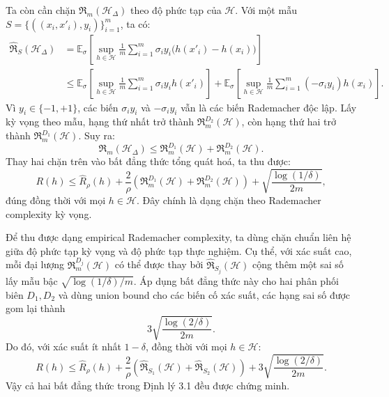 Ta còn cần chặn \(\mathfrak{R}_m(\mathcal{H}_{\Delta})\) theo độ phức tạp của \(\mathcal{H}\). Với một mẫu \(S=\{((x_i,x'_i),y_i)\}_{i=1}^{m}\), ta có:
\[
\begin{aligned}
    \widehat{\mathfrak{R}}_{S}(\mathcal{H}_{\Delta})
    &=
    \mathbb{E}_{\sigma}
    \left[
        \sup_{h\in\mathcal{H}}
        \frac{1}{m}
        \sum_{i=1}^{m}
        \sigma_i y_i
        \big(h(x'_i)-h(x_i)\big)
    \right] \\
    &\leq
    \mathbb{E}_{\sigma}
    \left[
        \sup_{h\in\mathcal{H}}
        \frac{1}{m}
        \sum_{i=1}^{m}
        \sigma_i y_i h(x'_i)
    \right]
    +
    \mathbb{E}_{\sigma}
    \left[
        \sup_{h\in\mathcal{H}}
        \frac{1}{m}
        \sum_{i=1}^{m}
        (-\sigma_i y_i) h(x_i)
    \right].
\end{aligned}
\]
Vì \(y_i\in\{-1,+1\}\), các biến \(\sigma_i y_i\) và \(-\sigma_i y_i\) vẫn là các biến Rademacher độc lập. Lấy kỳ vọng theo mẫu, hạng thứ nhất trở thành \(\mathfrak{R}^{D_2}_m(\mathcal{H})\), còn hạng thứ hai trở thành \(\mathfrak{R}^{D_1}_m(\mathcal{H})\). Suy ra:
\[
    \mathfrak{R}_m(\mathcal{H}_{\Delta})
    \leq
    \mathfrak{R}^{D_1}_m(\mathcal{H})
    +
    \mathfrak{R}^{D_2}_m(\mathcal{H}).
\]
Thay hai chặn trên vào bất đẳng thức tổng quát hoá, ta thu được:
\[
    R(h)
    \leq
    \widehat{R}_{\rho}(h)
    +
    \frac{2}{\rho}
    \left(
        \mathfrak{R}^{D_1}_m(\mathcal{H})
        +
        \mathfrak{R}^{D_2}_m(\mathcal{H})
    \right)
    +
    \sqrt{
        \frac{\log(1/\delta)}{2m}
    },
\]
đúng đồng thời với mọi \(h\in\mathcal{H}\). Đây chính là dạng chặn theo Rademacher complexity kỳ vọng.

Để thu được dạng empirical Rademacher complexity, ta dùng chặn chuẩn liên hệ giữa độ phức tạp kỳ vọng và độ phức tạp thực nghiệm. Cụ thể, với xác suất cao, mỗi đại lượng \(\mathfrak{R}^{D_j}_m(\mathcal{H})\) có thể được thay bởi \(\widehat{\mathfrak{R}}_{S_j}(\mathcal{H})\) cộng thêm một sai số lấy mẫu bậc \(\sqrt{\log(1/\delta)/m}\). Áp dụng bất đẳng thức này cho hai phân phối biên \(D_1,D_2\) và dùng union bound cho các biến cố xác suất, các hạng sai số được gom lại thành
\[
    3
    \sqrt{
        \frac{\log(2/\delta)}{2m}
    }.
\]
Do đó, với xác suất ít nhất \(1-\delta\), đồng thời với mọi \(h\in\mathcal{H}\):
\[
    R(h)
    \leq
    \widehat{R}_{\rho}(h)
    +
    \frac{2}{\rho}
    \left(
        \widehat{\mathfrak{R}}_{S_1}(\mathcal{H})
        +
        \widehat{\mathfrak{R}}_{S_2}(\mathcal{H})
    \right)
    +
    3
    \sqrt{
        \frac{\log(2/\delta)}{2m}
    }.
\]
Vậy cả hai bất đẳng thức trong Định lý 3.1 đều được chứng minh.

